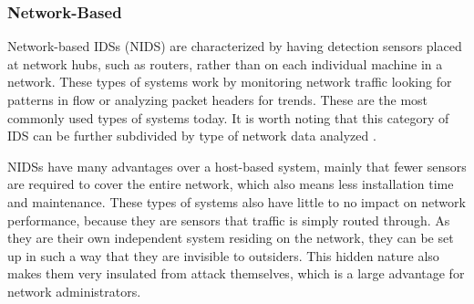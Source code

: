\documentclass{acm_proc_article-sp}
\begin{document}
    	\subsubsection{Network-Based}
    		Network-based IDSs (NIDS) are characterized by having detection sensors placed at network hubs, such as routers, rather than on each individual machine in a network. These types of systems work by monitoring network traffic looking for patterns in flow or analyzing packet headers for trends. These are the most commonly used types of systems today. It is worth noting that this category of IDS can be further subdivided by type of network data analyzed \cite{Bhuyan2011}. 
    		
    		NIDSs have many advantages over a host-based system, mainly that fewer sensors are required to cover the entire network, which also means less installation time and maintenance. These types of systems also have little to no impact on network performance, because they are sensors that traffic is simply routed through. As they are their own independent system residing on the network, they can be set up in such a way that they are invisible to outsiders. This hidden nature also makes them very insulated from attack themselves, which is a large advantage for network administrators. 
    		
\end{document}
